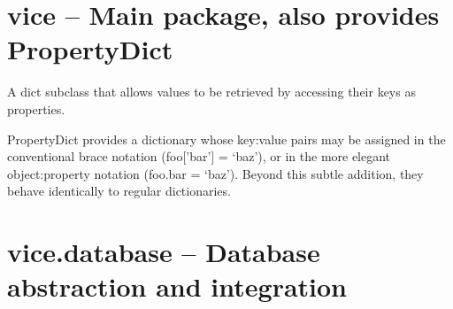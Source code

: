 \documentclass[letterpaper,10pt,english]{sphinxmanual}
\begin{document}
\chapter{vice -- Main package, also provides PropertyDict}
\label{api_reference:vice-main-package-also-provides-propertydict}\label{api_reference:vice}

\begin{fulllineitems}
\label{api_reference:vice.PropertyDict}
A dict subclass that allows values to be retrieved by accessing their
keys as properties.

PropertyDict provides a dictionary whose key:value pairs may be
assigned in the conventional brace notation (foo{[}'bar'{]} = `baz'),
or in the more elegant object:property notation (foo.bar = `baz').
Beyond this subtle addition, they behave identically to regular
dictionaries.

\end{fulllineitems}



\chapter{vice.database -- Database abstraction and integration}
\label{api_reference:vice-database-database-abstraction-and-integration}\label{api_reference:module-vice.database}\label{api_reference:vice-database}
\end{document}
